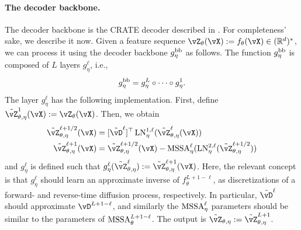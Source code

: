 \documentclass[../../book-main.tex]{subfiles}
\begin{document}
\paragraph{The decoder backbone.} The decoder backbone is the CRATE decoder described in . For completeness' sake, we describe it now. Given a feature sequence \(\vZ_{\theta}(\vX) := f_{\theta}(\vX) \in (\R^{d})^{*}\), we can process it using the decoder backbone \(g_{\eta}^{\mathrm{bb}}\) as follows. The function \(g_{\eta}^{\mathrm{bb}}\) is composed of \(L\) layers \(g_{\eta}^{\ell}\), i.e.,
\begin{equation}
    g_{\eta}^{\mathrm{bb}} = g_{\eta}^{L} \circ \cdots \circ g_{\eta}^{1}.
\end{equation}
The layer \(g_{\eta}^{\ell}\) has the following implementation. First, define \(\tilde{\vZ}_{\theta, \eta}^{1}(\vX) := \vZ_{\theta}(\vX)\). Then, we obtain
\begin{align}
    \tilde{\vZ}_{\theta, \eta}^{\ell + 1/2}(\vX) 
    &= [\tilde{\vD}^{\ell}]^{\top}\LN_{\eta}^{1, \ell}(\tilde{\vZ}_{\theta, \eta}^{\ell}(\vX)) \\ 
    \tilde{\vZ}_{\theta, \eta}^{\ell + 1}(\vX)
    &= \tilde{\vZ}_{\theta, \eta}^{\ell + 1/2}(\vX) - \MSSA_{\eta}^{\ell}(\LN_{\eta}^{2, \ell}(\tilde{\vZ}_{\theta, \eta}^{\ell + 1/2}))
\end{align}
and \(g_{\eta}^{\ell}\) is defined such that \(g_{\eta}^{\ell}(\tilde{\vZ}_{\theta, \eta}^{\ell}) := \tilde{\vZ}_{\theta, \eta}^{\ell + 1}(\vX)\). Here, the relevant concept is that \(g_{\eta}^{\ell}\) should learn an approximate inverse of \(f_{\theta}^{L + 1 - \ell}\), as discretizations of a forward- and reverse-time diffusion process, respectively. In particular, \(\tilde{\vD}^{\ell}\) should approximate \(\vD^{L + 1 - \ell}\), and similarly the \(\operatorname{MSSA}_{\eta}^{\ell}\) parameters should be similar to the parameters of \(\operatorname{MSSA}_{\theta}^{L + 1 - \ell}\). The output is \(\tilde{\vZ}_{\theta, \eta} := \tilde{\vZ}_{\theta, \eta}^{L + 1}\).
\end{document}
